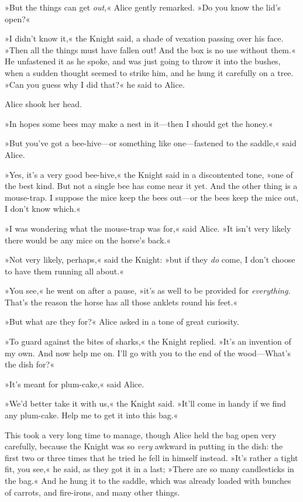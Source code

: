 »But the things can get \textit{out,}« Alice gently remarked. »Do you know the lid's open?«

»I didn't know it,« the Knight said, a shade of vexation passing over his face. »Then all the things must have fallen out! And the box is no use without them.« He unfastened it as he spoke, and was just going to throw it into the bushes, when a sudden thought seemed to strike him, and he hung it carefully on a tree. »Can you guess why I did that?« he said to Alice.

Alice shook her head.

»In hopes some bees may make a nest in it—then I should get the honey.«

»But you've got a bee-hive—or something like one—fastened to the saddle,« said Alice.

»Yes, it's a very good bee-hive,« the Knight said in a discontented tone, »one of the best kind. But not a single bee has come near it yet. And the other thing is a mouse-trap. I suppose the mice keep the bees out—or the bees keep the mice out, I don't know which.«

»I was wondering what the mouse-trap was for,« said Alice. »It isn't very likely there would be any mice on the horse's back.«

»Not very likely, perhaps,« said the Knight: »but if they \textit{do} come, I don't choose to have them running all about.«

»You see,« he went on after a pause, »it's as well to be provided for \textit{everything}. That's the reason the horse has all those anklets round his feet.«

»But what are they for?« Alice asked in a tone of great curiosity.

»To guard against the bites of sharks,« the Knight replied. »It's an invention of my own. And now help me on. I'll go with you to the end of the wood—What's the dish for?«

»It's meant for plum-cake,« said Alice.

»We'd better take it with us,« the Knight said. »It'll come in handy if we find any plum-cake. Help me to get it into this bag.«

This took a very long time to manage, though Alice held the bag open very carefully, because the Knight was so \textit{very} awkward in putting in the dish: the first two or three times that he tried he fell in himself instead. »It's rather a tight fit, you see,« he said, as they got it in a last; »There are so many candlesticks in the bag.« And he hung it to the saddle, which was already loaded with bunches of carrots, and fire-irons, and many other things.


